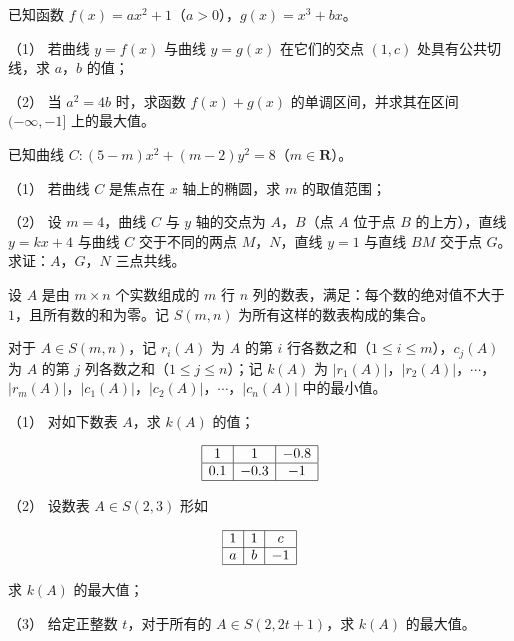 \begin{question}
已知函数 $f(x)=ax^2+1$（$a>0$），$g(x)=x^3+bx$。

（1） 若曲线 $y=f(x)$ 与曲线 $y=g(x)$ 在它们的交点 $(1,c)$ 处具有公共切线，求 $a$，$b$ 的值；

（2） 当 $a^2=4b$ 时，求函数 $f(x)+g(x)$ 的单调区间，并求其在区间 $(-\infty,-1]$ 上的最大值。

\end{question}
\begin{question}
已知曲线 $C:(5-m)x^2+(m-2)y^2=8$（$m\in\mathbf R$）。

（1） 若曲线 $C$ 是焦点在 $x$ 轴上的椭圆，求 $m$ 的取值范围；

（2） 设 $m=4$，曲线 $C$ 与 $y$ 轴的交点为 $A$，$B$（点 $A$ 位于点 $B$ 的上方），直线 $y=kx+4$ 与曲线 $C$ 交于不同的两点 $M$，$N$，直线 $y=1$ 与直线 $BM$ 交于点 $G$。求证：$A$，$G$，$N$ 三点共线。

\end{question}
\begin{question}
设 $A$ 是由 $m\times n$ 个实数组成的 $m$ 行 $n$ 列的数表，满足：每个数的绝对值不大于 $1$，且所有数的和为零。记 $S(m,n)$ 为所有这样的数表构成的集合。

对于 $A\in S(m,n)$，记 $r_i(A)$ 为 $A$ 的第 $i$ 行各数之和（$1\leqslant i\leqslant m$），$c_j(A)$ 为 $A$ 的第 $j$ 列各数之和（$1\leqslant j\leqslant n$）；记 $k(A)$ 为 $|r_1(A)|$，$|r_2(A)|$，$\cdots$，$|r_m(A)|$，$|c_1(A)|$，$|c_2(A)|$，$\cdots$，$|c_n(A)|$ 中的最小值。

（1） 对如下数表 $A$，求 $k(A)$ 的值；

\nopagebreak[4]
\[\begin{array}{|c|c|c|}\hline 1 & 1 & -0.8\\ \hline 0.1 & -0.3 & -1\\ \hline\end{array}\]

（2） 设数表 $A\in S(2,3)$ 形如

\nopagebreak[4]
\[\begin{array}{|c|c|c|}\hline 1 & 1 & c\\ \hline a & b & -1\\ \hline\end{array}\]

求 $k(A)$ 的最大值；

（3） 给定正整数 $t$，对于所有的 $A\in S(2,2t+1)$，求 $k(A)$ 的最大值。

\end{question}